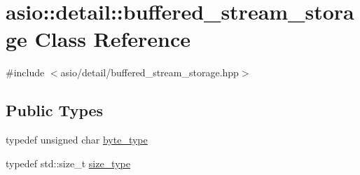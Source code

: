 \hypertarget{classasio_1_1detail_1_1buffered__stream__storage}{}\section{asio\+:\+:detail\+:\+:buffered\+\_\+stream\+\_\+storage Class Reference}
\label{classasio_1_1detail_1_1buffered__stream__storage}


{\ttfamily \#include $<$asio/detail/buffered\+\_\+stream\+\_\+storage.\+hpp$>$}

\subsection*{Public Types}
\begin{DoxyCompactItemize}
\item 
typedef unsigned char \hyperlink{classasio_1_1detail_1_1buffered__stream__storage_a8c60fd3097ec6de528a228a91d671f9d}{byte\+\_\+type}
\item 
typedef std\+::size\+\_\+t \hyperlink{classasio_1_1detail_1_1buffered__stream__storage_a1307072f53f7298ff9ce12e1d1f483cf}{size\+\_\+type}
\end{DoxyCompactItemize}
